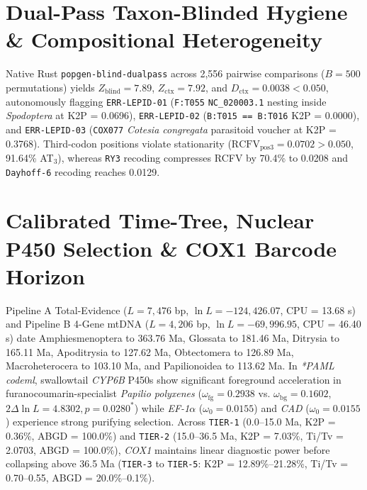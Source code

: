 \documentclass[10pt,letterpaper]{article}
\begin{document}
\section{Dual-Pass Taxon-Blinded Hygiene \& Compositional Heterogeneity}
Native Rust \texttt{popgen-blind-dualpass} across 2,556 pairwise comparisons ($B = 500$ permutations) yields $Z_{\text{blind}} = 7.89$, $Z_{\text{ctx}} = 7.92$, and $D_{\text{ctx}} = 0.0038 < 0.050$, autonomously flagging \texttt{ERR-LEPID-01} (\texttt{F:T055} \texttt{NC\_020003.1} nesting inside \textit{Spodoptera} at K2P = 0.0696), \texttt{ERR-LEPID-02} (\texttt{B:T015 == B:T016} K2P = 0.0000), and \texttt{ERR-LEPID-03} (\texttt{COX077} \textit{Cotesia congregata} parasitoid voucher at K2P = 0.3768). Third-codon positions violate stationarity ($\text{RCFV}_{\text{pos3}} = 0.0702 > 0.050$, 91.64\% AT$_3$), whereas \texttt{RY3} recoding compresses RCFV by 70.4\% to 0.0208 and \texttt{Dayhoff-6} recoding reaches 0.0129.

\section{Calibrated Time-Tree, Nuclear P450 Selection \& COX1 Barcode Horizon}
Pipeline A Total-Evidence ($L = 7,476$ bp, $\ln L = -124,426.07$, CPU = 13.68 s) and Pipeline B 4-Gene mtDNA ($L = 4,206$ bp, $\ln L = -69,996.95$, CPU = 46.40 s) date Amphiesmenoptera to 363.76 Ma, Glossata to 181.46 Ma, Ditrysia to 165.11 Ma, Apoditrysia to 127.62 Ma, Obtectomera to 126.89 Ma, Macroheterocera to 103.10 Ma, and Papilionoidea to 113.62 Ma. In \textit{*PAML codeml}, swallowtail \textit{CYP6B} P450s show significant foreground acceleration in furanocoumarin-specialist \textit{Papilio polyxenes} ($\omega_{\text{fg}} = 0.2938$ vs. $\omega_{\text{bg}} = 0.1602$, $2\Delta\ln L = 4.8302, p = 0.0280^*$) while \textit{EF-1$\alpha$} ($\omega_0 = 0.0155$) and \textit{CAD} ($\omega_0 = 0.0155$) experience strong purifying selection. Across \texttt{TIER-1} (0.0--15.0 Ma, K2P = 0.36\%, ABGD = 100.0\%) and \texttt{TIER-2} (15.0--36.5 Ma, K2P = 7.03\%, Ti/Tv = 2.0703, ABGD = 100.0\%), \textit{COX1} maintains linear diagnostic power before collapsing above 36.5 Ma (\texttt{TIER-3} to \texttt{TIER-5}: K2P = 12.89\%--21.28\%, Ti/Tv = 0.70--0.55, ABGD = 20.0\%--0.1\%).
\end{document}
